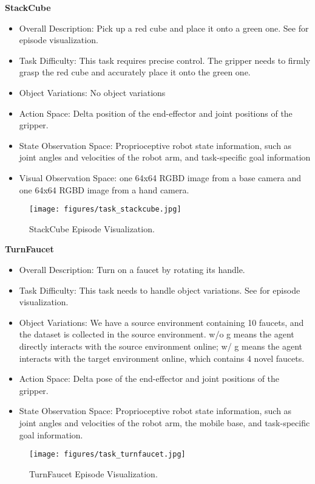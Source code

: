 \textbf{StackCube}
\begin{itemize}
    \item Overall Description: Pick up a red cube and place it onto a green one. See  for episode visualization.
    \item Task Difficulty: This task requires precise control. The gripper needs to firmly grasp the red cube and accurately place it onto the green one.
    \item Object Variations: No object variations
    \item Action Space: Delta position of the end-effector and joint positions of the gripper.
    \item State Observation Space: Proprioceptive robot state information, such as joint angles and velocities of the robot arm, and task-specific goal information
    \item Visual Observation Space: one 64x64 RGBD image from a base camera and one 64x64 RGBD image from a hand camera.
\end{itemize}
\begin{figure}[!ht]
    \centering
    \texttt{[image: figures/task\_stackcube.jpg]}
    \caption{StackCube Episode Visualization.}
    \label{fig:task_stackcube}
\end{figure}

\textbf{TurnFaucet}
\begin{itemize}
    \item Overall Description: Turn on a faucet by rotating its handle.
    \item Task Difficulty: This task needs to handle object variations. See  for episode visualization.
    \item Object Variations: We have a source environment containing 10 faucets, and the dataset is collected in the source environment. w/o g means the agent directly interacts with the source environment online; w/ g means the agent interacts with the target environment online, which contains 4 novel faucets.
    \item Action Space: Delta pose of the end-effector and joint positions of the gripper.
    \item State Observation Space: Proprioceptive robot state information, such as joint angles and velocities of the robot arm, the mobile base, and task-specific goal information.
\end{itemize}
\begin{figure}[!ht]
    \centering
    \texttt{[image: figures/task\_turnfaucet.jpg]}
    \caption{TurnFaucet Episode Visualization.}
    \label{fig:task_turnfaucet}
\end{figure}

